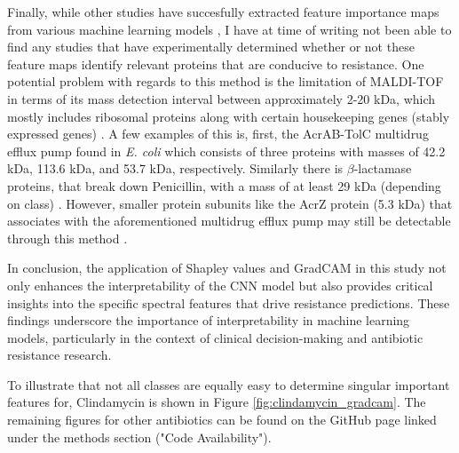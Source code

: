 \documentclass[english,11pt,a4paper,titlepage]{article}
\begin{document}
Finally, while other studies have succesfully extracted feature importance maps from various machine learning models \cite{weisDirectAntimicrobialResistance2022,wangRapidDetectionHeterogeneous2018,feucherollesCombinationMALDITOFMass2022}, I have at time of writing not been able to find any studies that have experimentally determined whether or not these feature maps identify relevant proteins that are conducive to resistance. One potential problem with regards to this method is the limitation of MALDI-TOF in terms of its mass detection interval between approximately 2-20 kDa, which mostly includes ribosomal proteins along with certain housekeeping genes (stably expressed genes) \cite{singhalMALDITOFMassSpectrometry2015}. A few  examples of this is, first, the AcrAB-TolC multidrug efflux pump found in \textit{E. coli}  \cite{wangAllostericTransportMechanism2017} which consists of three proteins with masses of 42.2 kDa, 113.6 kDa, and 53.7 kDa, respectively. Similarly there is \( \beta \)-lactamase proteins, that break down Penicillin, with a mass of at least 29 kDa (depending on class) \cite{jelschLactamaseTEM1Coli1992}. However, smaller protein subunits like the AcrZ protein (5.3 kDa) that associates with the aforementioned multidrug efflux pump \cite{hobbsConservedSmallProtein2012} may still be detectable through this method . 

In conclusion, the application of Shapley values and GradCAM in this study not only enhances the interpretability of the CNN model but also provides critical insights into the specific spectral features that drive resistance predictions. These findings underscore the importance of interpretability in machine learning models, particularly in the context of clinical decision-making and antibiotic resistance research.

To illustrate that not all classes are equally easy to determine singular important features for, Clindamycin is shown in Figure \ref{fig:clindamycin_gradcam}. The remaining figures for other antibiotics can be found on the GitHub page linked under the methods section ("Code Availability").
\end{document}
